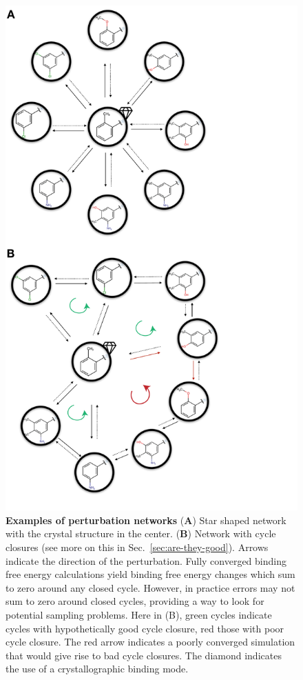 \documentclass[9pt,bestpractices,pubversion]{livecoms}
\begin{document}
\begin{figure}
    \includegraphics[width=0.95\columnwidth]{figures/fig6_types_of_networks/Figure.pdf}
    \caption{\textbf{Examples of perturbation networks} (\textbf{A}) Star shaped network with the crystal structure in the center. (\textbf{B}) Network with cycle closures (see more on this in Sec.~\ref{sec:are-they-good}). Arrows indicate the direction of the perturbation. Fully converged binding free energy calculations yield binding free energy changes which sum to zero around any closed cycle. However, in practice errors may not sum to zero around closed cycles, providing a way to look for potential sampling problems. Here in (B), green cycles indicate cycles with hypothetically good cycle closure, red those with poor cycle closure. The red arrow indicates a poorly converged simulation that would give rise to bad cycle closures. The diamond indicates the use of a crystallographic binding mode.}
    \label{fig:fig_types_of_networks}
\end{figure} 
\end{document}
